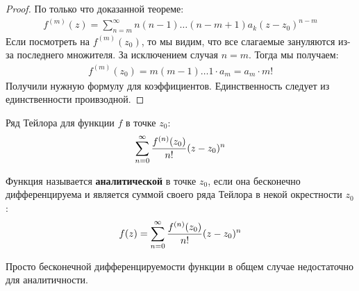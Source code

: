 \begin{proof}
    По только что доказанной теореме: 
    \begin{gather*}
        f^{(m)}(z) = \sum\limits_{n=m}^\infty n(n-1)\dots (n-m+1)a_k (z-z_0)^{n-m}
    \end{gather*}
    Если посмотреть на $f^{(m)}(z_0)$, то мы видим, что все слагаемые зануляются из-за последнего множителя. За исключением случая $n=m$. Тогда мы получаем:
    \begin{gather*}
        f^{(m)}(z_0) = m(m-1) \dots 1 \cdot a_m = a_m \cdot m!
    \end{gather*}
    Получили нужную формулу для коэффициентов. Единственность следует из единственности проивзодной.
\end{proof}
\begin{conj}
    Ряд Тейлора для функции $f$ в точке $z_0$:
    \begin{gather*}
        \sum\limits_{n=0}^\infty \frac{f^{(n)}(z_0)}{n!} (z - z_0)^n
    \end{gather*}
\end{conj}
\begin{conj}
    Функция называется \textbf{аналитической} в точке $z_0$, если она бесконечно 
    дифференцируема и является суммой своего ряда Тейлора в некой окрестности $z_0$:
    \begin{gather*}
       f(z) = \sum\limits_{n=0}^\infty \frac{f^{(n)}(z_0)}{n!} (z - z_0)^n 
    \end{gather*}
\end{conj}
\notice \; Просто бесконечной дифференцируемости функции в общем случае недостаточно для аналитичности.

